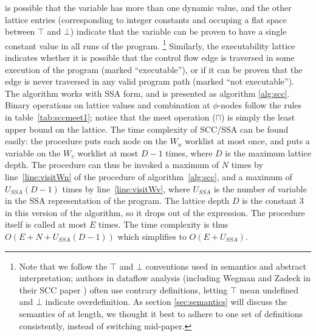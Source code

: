 \documentclass[12pt,titlepage,twoside]{article}
\newcommand{\meet}{\ensuremath{\sqcap}}
\begin{document}
is possible that the variable has more than one dynamic value, and the
other lattice entries (corresponding to integer constants and occuping
a flat space between $\top$ and $\bot$) indicate that the variable can
be proven to have a single constant value in all runs of the program.%
\footnote{Note that we follow the $\top$ and $\bot$ conventions used
in semantics and abstract interpretation; authors in dataflow analysis
(including Wegman and Zadeck in their SCC paper \cite{wegman91:scc})
often use contrary definitions, letting $\top$ mean undefined and
$\bot$ indicate overdefinition.  As section \ref{sec:semantics} will
discuss the semantics of \ssiplus at length, we thought it best to
adhere to one set of definitions consistently, instead of switching
mid-paper.}
Similarly, the executability lattice indicates whether it is possible
that the control flow edge is traversed in some execution of the
program (marked ``executable''), or if it can be proven that the edge
is never traversed in any valid program path (marked ``not
executable'').  The algorithm works with SSA form, and is presented
as algorithm \ref{alg:scc}.  Binary operations on lattice values and
combination at $\phi$-nodes follow the rules in
table~\ref{tab:sccmeet1}; notice that the meet operation ($\meet$) is
simply the least upper bound on the lattice.
The time complexity of SCC/SSA can be found
easily: the procedure  puts each node on the $W_n$
worklist at most once, and  puts a variable on the $W_v$
worklist at most $D-1$ times, where $D$ is the maximum lattice depth.
The  procedure can thus be invoked a maximum of $N$ times
by line~\ref{line:visitWn} of the  procedure of
algorithm~\ref{alg:scc}, and a maximum of $U_{SSA}(D-1)$ times by
line~\ref{line:visitWv}, where $U_{SSA}$ is the number of variable
 in the SSA representation of the program.  The lattice
depth $D$ is the constant 3 in this version of the algorithm, so it
drops out of the expression.  The  procedure itself is
called at most $E$ times.  The time complexity is thus
$O(E+N+U_{SSA}(D-1))$ which simplifies to $O(E+U_{SSA})$.
\end{document}
